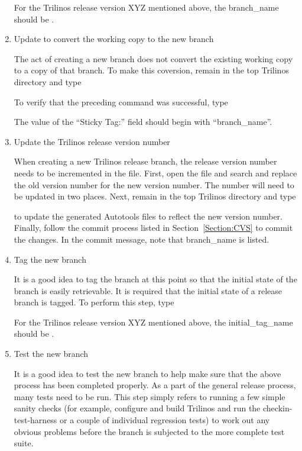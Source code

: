 \documentclass[12pt,relax]{TrilinosDevGuide}
\begin{document}
\begin{enumerate}
For the Trilinos release version XYZ mentioned above, the branch\_name 
should be .

\item Update to convert the working copy to the new branch

The act of creating a new branch does not convert the existing working copy to 
a copy of that branch.  To make this coversion, remain in the top Trilinos 
directory and type


To verify that the preceding command was successful, type 


The value of the ``Sticky Tag:'' field should begin with ``branch\_name''.

\item Update the Trilinos release version number

When creating a new Trilinos release branch, the release version number needs 
to be incremented in the  file.  First, 
open the file and search and replace the old version number for the new 
version number.  The number will need to be updated in two places.  Next, 
remain in the top Trilinos directory and type


to update the generated Autotools files to reflect the new version number.  
Finally, follow the commit process listed in Section~\ref{Section:CVS} to 
commit the changes.  In the commit message, note that branch\_name is listed.

\item Tag the new branch

It is a good idea to tag the branch at this point so that the initial state 
of the branch is easily retrievable.  It is required that the initial state of 
a release branch is tagged.  To perform this step, type


For the Trilinos release version XYZ mentioned above, the initial\_tag\_name 
should be .

\item Test the new branch

It is a good idea to test the new branch to help make sure that the above 
process has been completed properly.  As a part of the general release process,
many tests need to be run.  This step simply refers to running a few 
simple sanity checks (for example, configure and build Trilinos and run the 
checkin-test-harness or a couple of individual regression tests) to work 
out any obvious problems before the branch is subjected to the more 
complete test suite.

\end{enumerate}

\end{document}
